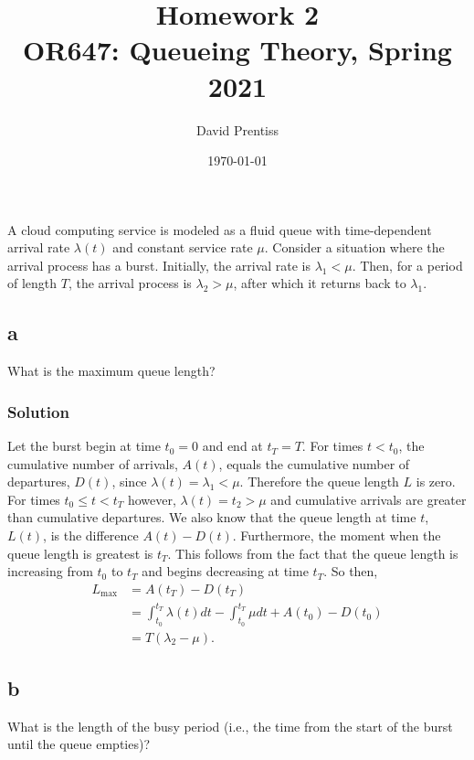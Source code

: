 \documentclass[letterpaper]{amsart}
\title[Homework 2]{Homework 2 \\ OR647: Queueing Theory, Spring 2021}
\author{David Prentiss}
\date{\today}
\begin{document}
\maketitle

\section{} %
A cloud computing service is modeled as a fluid queue with time-dependent
arrival rate $\lambda(t)$ and constant service rate $\mu$. Consider a situation where the
arrival process has a burst. Initially, the arrival rate is $\lambda_1<\mu$. Then, for a
period of length $T$, the arrival process is $\lambda_2>\mu$, after which it
returns back to $\lambda_1$.

\subsection*{a}
What is the maximum queue length?
\subsubsection*{Solution}
Let the burst begin at time $t_0 = 0$ and end at $t_T = T$. For times $t<t_0$, the
cumulative number of arrivals, $A(t)$, equals the cumulative number of
departures, $D(t)$, since $\lambda(t) = \lambda_1 < \mu$. Therefore the queue
length $L$ is zero. For times $t_0\leq t<t_T$ however, $\lambda(t) = t_2 > \mu$
and cumulative arrivals are greater than cumulative departures. We also know
that the queue length at time $t$, $L(t)$, is the difference $A(t)-D(t)$.
Furthermore, the moment when the queue length is greatest is $t_T$. This follows
from the fact that the queue length is increasing from $t_0$ to $t_T$ and begins
decreasing at time $t_T$. So then,
\begin{align*}
  L_\text{max} &= A(t_T) - D(t_T) \\
  &= \int_{t_0}^{t_T}\lambda(t)dt - \int_{t_0}^{t_T}\mu dt + A(t_0)-D(t_0) \\
  &= T(\lambda_2 - \mu).
\end{align*}

\subsection*{b}
What is the length of the busy period (i.e., the time from the start of the burst until the
queue empties)?
\end{document}
